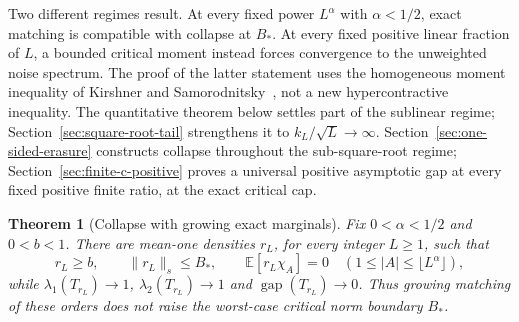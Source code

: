 \documentclass[11pt]{article}
\newtheorem{theorem}{Theorem}
\newcommand{\gap}{\operatorname{gap}}
\begin{document}
Two different regimes result. At every fixed power $L^\alpha$ with
$\alpha<1/2$, exact matching is compatible with collapse at $B_*$.
At every fixed positive linear fraction of $L$, a bounded critical moment
instead forces convergence to the unweighted noise spectrum. The proof of
the latter statement uses the homogeneous moment inequality of
Kirshner and Samorodnitsky~\cite{kirshner-samorodnitsky}, not a new
hypercontractive inequality. The quantitative theorem below settles part of the sublinear regime; Section~\ref{sec:square-root-tail} strengthens it to $k_L/\sqrt L\to\infty$. Section~\ref{sec:one-sided-erasure} constructs collapse throughout the sub-square-root regime; Section~\ref{sec:finite-c-positive} proves a universal positive asymptotic gap at every fixed positive finite ratio, at the exact critical cap.

\begin{theorem}[Collapse with growing exact marginals]
\label{thm:growing-collapse}
Fix $0<\alpha<1/2$ and $0<b<1$. There are mean-one densities $r_L$,
for every integer $L\geq1$, such that
\[
 r_L\geq b,\qquad \|r_L\|_s\leq B_*,\qquad
 \mathbb E[r_L\chi_A]=0\quad(1\leq |A|\leq\lfloor L^\alpha\rfloor),
\]
while $\lambda_1(T_{r_L})\to1$, $\lambda_2(T_{r_L})\to1$ and
$\gap(T_{r_L})\to0$. Thus growing matching of these orders does not
raise the worst-case critical norm boundary $B_*$.
\end{theorem}
\end{document}
